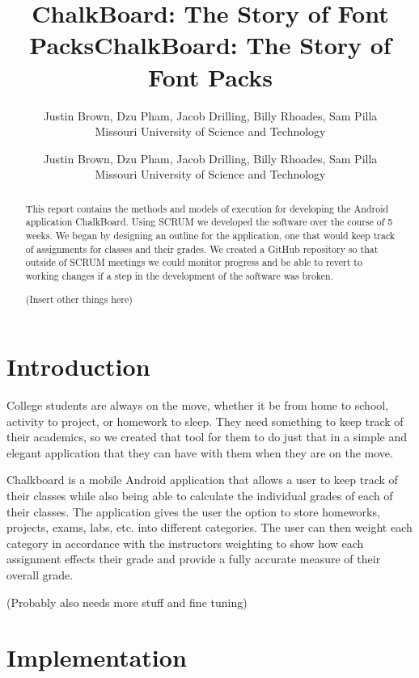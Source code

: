 \documentclass[a4paper]{article} %
\title{ChalkBoard: The Story of Font Packs}
\author{Justin Brown, Dzu Pham, Jacob Drilling, Billy Rhoades, Sam Pilla \\ %
       Missouri University of Science and Technology %
       }%
\date{}
\title{\vspace{30mm}ChalkBoard: The Story of Font Packs}
\author{Justin Brown, Dzu Pham, Jacob Drilling, Billy Rhoades, Sam Pilla \\%
       Missouri University of Science and Technology%
       }%
\begin{document}
\maketitle

\pagebreak

\tableofcontents

\pagebreak

\thispagestyle{empty}

\setlength\parindent{0pt}


\begin{abstract}

This report contains the methods and models of execution for developing the Android application ChalkBoard. Using SCRUM we developed the software over the course of 5 weeks. We began by designing an outline for the application, one that would keep track of assignments for classes and their grades. We created a GitHub repository so that outside of SCRUM meetings we could monitor progress and be able to revert to working changes if a step in the development of the software was broken.

(Insert other things here)

\end{abstract}

\section{Introduction}

College students are always on the move, whether it be from home to school, activity to project, or homework to sleep. They need something to keep track of their academics, so we created that tool for them to do just that in a simple and elegant application that they can have with them when they are on the move.


Chalkboard is a mobile Android application that allows a user to keep track of their classes while also being able to calculate the individual grades of each of their classes. The application gives the user the option to store homeworks, projects, exams, labs, etc. into different categories. The user can then weight each category in accordance with the instructors weighting to show how each assignment effects their grade and provide a fully accurate measure of their overall grade. 

(Probably also needs more stuff and fine tuning)

\section{Implementation}
\end{document}
